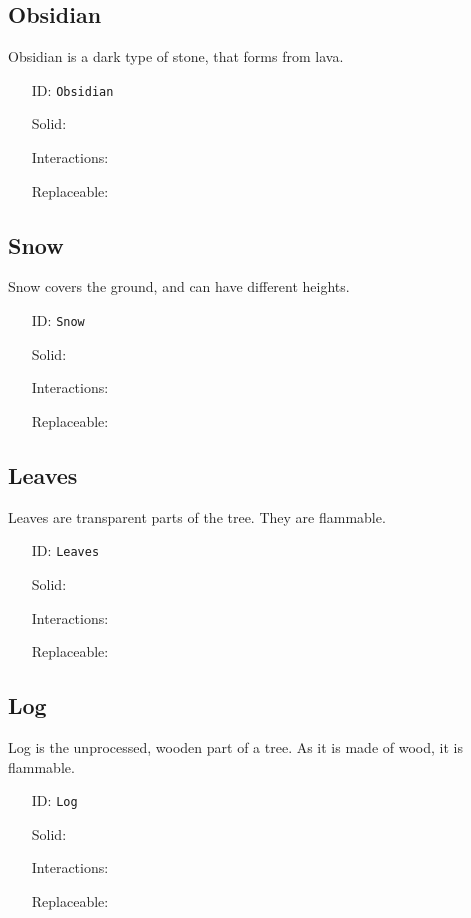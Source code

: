 \subsection{Obsidian}\label{subsec:blocks_obsidian}
Obsidian is a dark type of stone, that forms from lava.
\newline
\begin{itemize}[nosep]
    \item[ID:] \texttt{Obsidian}
    \item[Solid:]  \Checkmark \item[Interactions:]  \XSolidBrush \item[Replaceable:]  \XSolidBrush
\end{itemize}

\subsection{Snow}\label{subsec:blocks_snow}
Snow covers the ground, and can have different heights.
\newline
\begin{itemize}[nosep]
    \item[ID:] \texttt{Snow}
    \item[Solid:]  \Checkmark \item[Interactions:]  \Checkmark \item[Replaceable:]  \XSolidBrush
\end{itemize}

\subsection{Leaves}\label{subsec:blocks_leaves}
Leaves are transparent parts of the tree. They are flammable.
\newline
\begin{itemize}[nosep]
    \item[ID:] \texttt{Leaves}
    \item[Solid:]  \Checkmark \item[Interactions:]  \XSolidBrush \item[Replaceable:]  \XSolidBrush
\end{itemize}

\subsection{Log}\label{subsec:blocks_log}
Log is the unprocessed, wooden part of a tree. As it is made of wood, it is flammable.
\newline
\begin{itemize}[nosep]
    \item[ID:] \texttt{Log}
    \item[Solid:]  \Checkmark \item[Interactions:]  \XSolidBrush \item[Replaceable:]  \XSolidBrush
\end{itemize}


